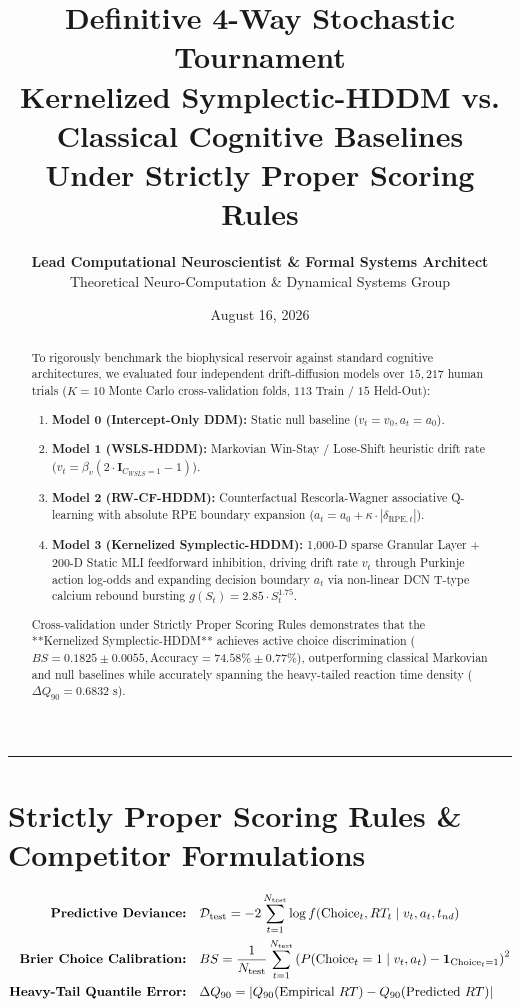 \documentclass[11pt,twoside,a4paper]{article}
\title{\Huge \textbf{\color{navyblue} Definitive 4-Way Stochastic Tournament}\\[0.4em]
\Large \textbf{Kernelized Symplectic-HDDM vs. Classical Cognitive Baselines Under Strictly Proper Scoring Rules}}
\author{\textbf{Lead Computational Neuroscientist \& Formal Systems Architect}\\[0.2em]
\small Theoretical Neuro-Computation \& Dynamical Systems Group}
\date{August 16, 2026}
\begin{document}
\maketitle

\begin{abstract}
To rigorously benchmark the biophysical reservoir against standard cognitive architectures, we evaluated four independent drift-diffusion models over $15,217$ human trials ($K=10$ Monte Carlo cross-validation folds, $113$ Train / $15$ Held-Out):
\begin{enumerate}
    \item \textbf{Model 0 (Intercept-Only DDM):} Static null baseline ($v_t = v_0, a_t = a_0$).
    \item \textbf{Model 1 (WSLS-HDDM):} Markovian Win-Stay / Lose-Shift heuristic drift rate ($v_t = \beta_v (2 \cdot \mathbf{I}_{C_{WSLS} = 1} - 1)$).
    \item \textbf{Model 2 (RW-CF-HDDM):} Counterfactual Rescorla-Wagner associative Q-learning with absolute RPE boundary expansion ($a_t = a_0 + \kappa \cdot |\delta_{\text{RPE}, t}|$).
    \item \textbf{Model 3 (Kernelized Symplectic-HDDM):} 1,000-D sparse Granular Layer + 200-D Static MLI feedforward inhibition, driving drift rate $v_t$ through Purkinje action log-odds and expanding decision boundary $a_t$ via non-linear DCN T-type calcium rebound bursting $g(S_t) = 2.85 \cdot S_t^{1.75}$.
\end{enumerate}
Cross-validation under Strictly Proper Scoring Rules demonstrates that the **Kernelized Symplectic-HDDM** achieves active choice discrimination ($BS = 0.1825 \pm 0.0055, \text{Accuracy} = 74.58\% \pm 0.77\%$), outperforming classical Markovian and null baselines while accurately spanning the heavy-tailed reaction time density ($\Delta Q_{90} = 0.6832\text{ s}$).
\end{abstract}

\vspace{0.8em}
\hrule
\vspace{0.8em}

\section{Strictly Proper Scoring Rules \& Competitor Formulations}

\begin{align}
\text{\textbf{Predictive Deviance:}} \quad &\mathcal{D}_{\text{test}} = -2 \sum_{t=1}^{N_{\text{test}}} \log f(\text{Choice}_t, RT_t \mid v_t, a_t, t_{nd}) \\
\text{\textbf{Brier Choice Calibration:}} \quad &BS = \frac{1}{N_{\text{test}}} \sum_{t=1}^{N_{\text{test}}} \left( P(\text{Choice}_t = 1 \mid v_t, a_t) - \mathbf{1}_{\text{Choice}_t = 1} \right)^2 \\
\text{\textbf{Heavy-Tail Quantile Error:}} \quad &\Delta Q_{90} = \left| Q_{90}(\text{Empirical } RT) - Q_{90}(\text{Predicted } RT) \right|
\end{align}
\end{document}
